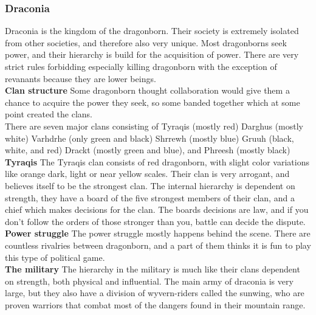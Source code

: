 \documentclass[a4paper]{article}
\begin{document}
\subsubsection{Draconia}
Draconia is the kingdom of the dragonborn. Their society is extremely isolated from other societies, and therefore also very unique. Most dragonborns seek power, and their hierarchy is build for the acquisition of power. There are very strict rules forbidding especially killing dragonborn with the exception of revanants because they are lower beings.
\\
\textbf{Clan structure}
Some dragonborn thought collaboration would give them a chance to acquire the power they seek, so some banded together which at some point created the clans.
\\
There are seven major clans consisting of Tyraqis (mostly red) Darghus (mostly white) Varhdrhe (only green and black) Shrrewh (mostly blue) Gruuh (black, white, and red) Drackt (mostly green and blue), and Phreesh (mostly black)
\\
\textbf{Tyraqis}
The Tyraqis clan consists of red dragonborn, with slight color variations like orange dark, light or  near yellow scales. Their clan is very arrogant, and believes itself to be the strongest clan. The internal hierarchy is dependent on strength, they have a board of the five strongest members of their clan, and a chief which makes decisions for the clan. The boards decisions are law, and if you don't follow the orders of those stronger than you, battle can decide the dispute.
\\
\textbf{Power struggle}
The power struggle mostly happens behind the scene. There are countless rivalries between dragonborn, and a part of them thinks it is fun to play this type of political game. 
\\
\textbf{The military}
The hierarchy in the military is much like their clans dependent on strength, both physical and influential. The main army of draconia is very large, but they also have a division of wyvern-riders called the sunwing, who are proven warriors that combat most of the dangers found in their mountain range.
\end{document}
